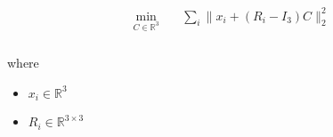 \documentclass[12pt]{article}
\begin{document}
\begin{align*}
\begin{aligned} \min_{\textit{C} \in \mathbb{R}^{ 3}} \quad & \sum_\textit{i} \|\textit{x}_{ \textit{i} } + \left( \textit{R}_{ \textit{i} } - I_{ 3 } \right)\textit{C}\|_2^{2} \\
\end{aligned}
\end{align*}

where
\begin{itemize}
\item $\textit{x}_{\textit{i}} \in \mathbb{R}^{ 3}$
\item $\textit{R}_{\textit{i}} \in \mathbb{R}^{ 3 \times 3 }$
\end{itemize}
\end{document}
